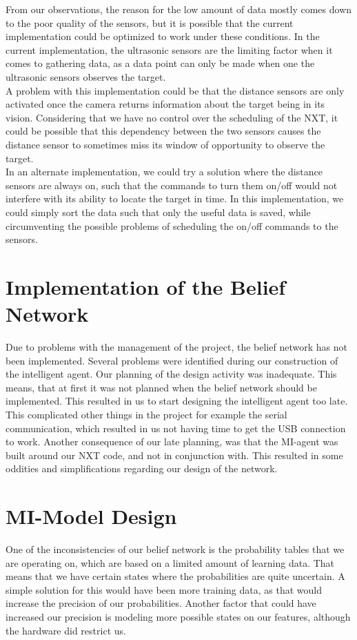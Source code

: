 From our observations, the reason for the low amount of data mostly comes down
to the poor quality of the sensors, but it is possible that the current
implementation could be optimized to work under these conditions. In the current
implementation, the ultrasonic sensors are the limiting factor when it comes to
gathering data, as a data point can only be made when one the ultrasonic sensors
observes the target.\\
A problem with this implementation could be that the distance sensors are only
activated once the camera returns information about the target being in its
vision. Considering that we have no control over the scheduling of the NXT, it
could be possible that this dependency between the two sensors causes the
distance sensor to sometimes miss its window of opportunity to observe the
target.\\
In an alternate implementation, we could try a solution where the distance
sensors are always on, such that the commands to turn them on/off would not
interfere with its ability to locate the target in time. In this implementation,
we could simply sort the data such that only the useful data is saved, while
circumventing the possible problems of scheduling the on/off commands to the
sensors.

\section{Implementation of the Belief Network}
Due to problems with the management of the project, the belief network has
not been implemented. Several problems were identified during our construction
of the intelligent agent. Our planning of the design activity was inadequate.
This means, that at first it was not planned when the belief network should be
implemented. This resulted in us to start designing the intelligent agent
too late. 
This complicated other things in the project for example the serial
communication, which resulted in us not having time to get the USB connection to work. Another consequence of our late
planning, was that the MI-agent was built around our NXT code, and not in
conjunction with. This resulted in some oddities and simplifications regarding our design of the network.


\section{MI-Model Design}
One of the inconsistencies of our belief network is the probability tables that
we are operating on, which are based on a limited amount of learning data. That
means that we have certain states where the probabilities are quite uncertain. A
simple solution for this would have been more training data, as that would
increase the precision of our probabilities. Another factor that could have
increased our precision is modeling more possible states on our features,
although the hardware did restrict us.

